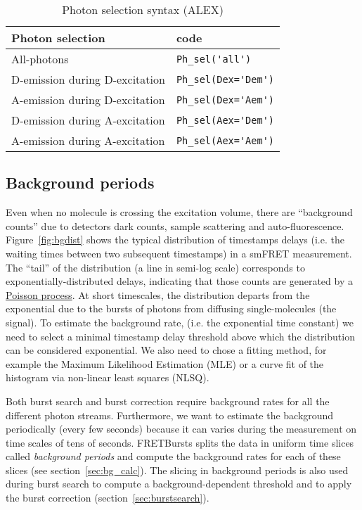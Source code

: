 \begin{table}
\begin{tabular}{l|l}
  Photon selection  & code \\
  \hline
  All-photons & \verb|Ph_sel('all')|\\
  D-emission during D-excitation & \verb|Ph_sel(Dex='Dem')|\\
  A-emission during D-excitation & \verb|Ph_sel(Dex='Aem')|\\
  D-emission during A-excitation & \verb|Ph_sel(Aex='Dem')|\\
  A-emission during A-excitation & \verb|Ph_sel(Aex='Aem')|\\
\end{tabular}
\caption{\label{tab:ph_sel_alex}Photon selection syntax (ALEX)}
\end{table}

\subsection{Background periods}
\label{sec:bg_intro}

Even when no molecule is crossing the excitation volume, there are “background counts” due to detectors dark counts, sample scattering and auto-fluorescence. Figure~\ref{fig:bgdist} shows the typical distribution of timestamps delays (i.e. the waiting times between two subsequent timestamps) in a smFRET measurement. The “tail” of the distribution (a line in semi-log scale) corresponds to exponentially-distributed delays, indicating that those counts are generated by a \href{http://en.wikipedia.org/wiki/Poisson_process}{Poisson process}. At short timescales, the distribution departs from the exponential due to the bursts of photons from diffusing single-molecules (the signal). To estimate the background rate, (i.e. the exponential time constant) we need to select a minimal timestamp delay threshold above which the distribution can be considered exponential. We also need to chose a fitting method, for example the Maximum Likelihood Estimation (MLE) or a curve fit of the histogram via non-linear least squares (NLSQ).

Both burst search and burst correction require background rates for all the different photon streams. Furthermore, we want to estimate the background periodically (every few seconds) because it can varies during the measurement on time scales of tens of seconds. FRETBursts splits the data in uniform time slices called \textit{background periods} and compute the background rates for each of these slices (see section~\ref{sec:bg_calc}). The slicing in background periods is also used during burst search to compute a background-dependent threshold and to apply the burst correction (section~\ref{sec:burstsearch}).

